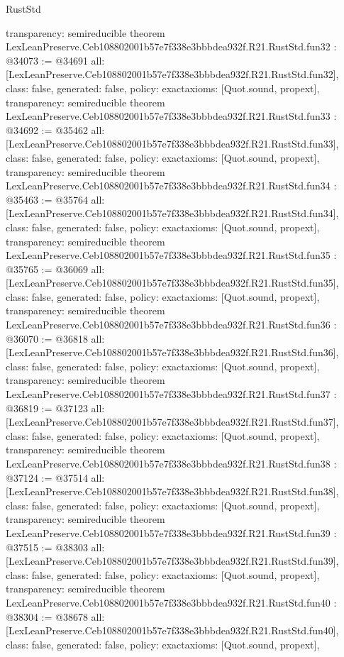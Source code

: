 \begin{lexlean}{RustStd}
\begin{coremodule}
{  transparency: semireducible
}
theorem LexLeanPreserve.Ceb108802001b57e7f338e3bbbdea932f.R21.RustStd.fun32 : @34073 := @34691 {
  all: [LexLeanPreserve.Ceb108802001b57e7f338e3bbbdea932f.R21.RustStd.fun32],
  class: false,
  generated: false,
  policy: exact{axioms: [Quot.sound, propext]},
  transparency: semireducible
}
theorem LexLeanPreserve.Ceb108802001b57e7f338e3bbbdea932f.R21.RustStd.fun33 : @34692 := @35462 {
  all: [LexLeanPreserve.Ceb108802001b57e7f338e3bbbdea932f.R21.RustStd.fun33],
  class: false,
  generated: false,
  policy: exact{axioms: [Quot.sound, propext]},
  transparency: semireducible
}
theorem LexLeanPreserve.Ceb108802001b57e7f338e3bbbdea932f.R21.RustStd.fun34 : @35463 := @35764 {
  all: [LexLeanPreserve.Ceb108802001b57e7f338e3bbbdea932f.R21.RustStd.fun34],
  class: false,
  generated: false,
  policy: exact{axioms: [Quot.sound, propext]},
  transparency: semireducible
}
theorem LexLeanPreserve.Ceb108802001b57e7f338e3bbbdea932f.R21.RustStd.fun35 : @35765 := @36069 {
  all: [LexLeanPreserve.Ceb108802001b57e7f338e3bbbdea932f.R21.RustStd.fun35],
  class: false,
  generated: false,
  policy: exact{axioms: [Quot.sound, propext]},
  transparency: semireducible
}
theorem LexLeanPreserve.Ceb108802001b57e7f338e3bbbdea932f.R21.RustStd.fun36 : @36070 := @36818 {
  all: [LexLeanPreserve.Ceb108802001b57e7f338e3bbbdea932f.R21.RustStd.fun36],
  class: false,
  generated: false,
  policy: exact{axioms: [Quot.sound, propext]},
  transparency: semireducible
}
theorem LexLeanPreserve.Ceb108802001b57e7f338e3bbbdea932f.R21.RustStd.fun37 : @36819 := @37123 {
  all: [LexLeanPreserve.Ceb108802001b57e7f338e3bbbdea932f.R21.RustStd.fun37],
  class: false,
  generated: false,
  policy: exact{axioms: [Quot.sound, propext]},
  transparency: semireducible
}
theorem LexLeanPreserve.Ceb108802001b57e7f338e3bbbdea932f.R21.RustStd.fun38 : @37124 := @37514 {
  all: [LexLeanPreserve.Ceb108802001b57e7f338e3bbbdea932f.R21.RustStd.fun38],
  class: false,
  generated: false,
  policy: exact{axioms: [Quot.sound, propext]},
  transparency: semireducible
}
theorem LexLeanPreserve.Ceb108802001b57e7f338e3bbbdea932f.R21.RustStd.fun39 : @37515 := @38303 {
  all: [LexLeanPreserve.Ceb108802001b57e7f338e3bbbdea932f.R21.RustStd.fun39],
  class: false,
  generated: false,
  policy: exact{axioms: [Quot.sound, propext]},
  transparency: semireducible
}
theorem LexLeanPreserve.Ceb108802001b57e7f338e3bbbdea932f.R21.RustStd.fun40 : @38304 := @38678 {
  all: [LexLeanPreserve.Ceb108802001b57e7f338e3bbbdea932f.R21.RustStd.fun40],
  class: false,
  generated: false,
  policy: exact{axioms: [Quot.sound, propext]},
}
\end{coremodule}
\end{lexlean}
